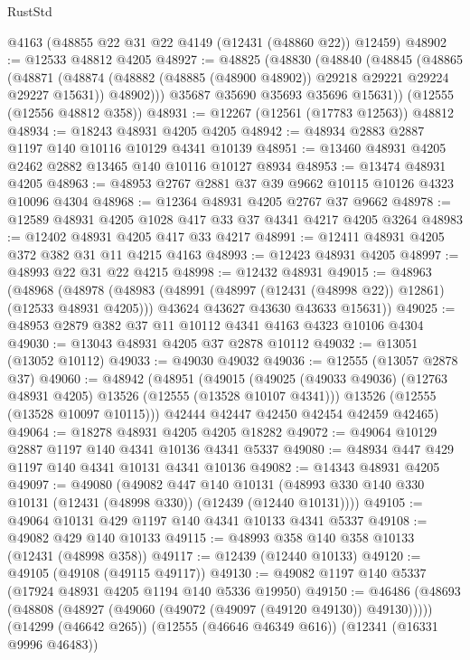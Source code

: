 \begin{lexlean}{RustStd}
\begin{coremodule}
    @4163
    (@48855 @22 @31 @22 @4149 (@12431 (@48860 @22)) @12459)
@48902 := @12533 @48812 @4205
@48927 := @48825
    (@48830
      (@48840
        (@48845
          (@48865
            (@48871
              (@48874 (@48882 (@48885 (@48900 @48902)) @29218 @29221 @29224 @29227 @15631))
              @48902)))
        @35687
        @35690
        @35693
        @35696
        @15631))
    (@12555 (@12556 @48812 @358))
@48931 := @12267 (@12561 (@17783 @12563)) @48812
@48934 := @18243 @48931 @4205 @4205
@48942 := @48934 @2883 @2887 @1197 @140 @10116 @10129 @4341 @10139
@48951 := @13460 @48931 @4205 @2462 @2882 @13465 @140 @10116 @10127 @8934
@48953 := @13474 @48931 @4205
@48963 := @48953 @2767 @2881 @37 @39 @9662 @10115 @10126 @4323 @10096 @4304
@48968 := @12364 @48931 @4205 @2767 @37 @9662
@48978 := @12589 @48931 @4205 @1028 @417 @33 @37 @4341 @4217 @4205 @3264
@48983 := @12402 @48931 @4205 @417 @33 @4217
@48991 := @12411 @48931 @4205 @372 @382 @31 @11 @4215 @4163
@48993 := @12423 @48931 @4205
@48997 := @48993 @22 @31 @22 @4215
@48998 := @12432 @48931
@49015 := @48963
    (@48968
      (@48978
        (@48983 (@48991 (@48997 (@12431 (@48998 @22)) @12861) (@12533 @48931 @4205)))
        @43624
        @43627
        @43630
        @43633
        @15631))
@49025 := @48953 @2879 @382 @37 @11 @10112 @4341 @4163 @4323 @10106 @4304
@49030 := @13043 @48931 @4205 @37 @2878 @10112
@49032 := @13051 (@13052 @10112)
@49033 := @49030 @49032
@49036 := @12555 (@13057 @2878 @37)
@49060 := @48942
    (@48951
      (@49015
        (@49025 (@49033 @49036) (@12763 @48931 @4205) @13526 (@12555 (@13528 @10107 @4341)))
        @13526
        (@12555 (@13528 @10097 @10115)))
      @42444
      @42447
      @42450
      @42454
      @42459
      @42465)
@49064 := @18278 @48931 @4205 @4205 @18282
@49072 := @49064 @10129 @2887 @1197 @140 @4341 @10136 @4341 @5337
@49080 := @48934 @447 @429 @1197 @140 @4341 @10131 @4341 @10136
@49082 := @14343 @48931 @4205
@49097 := @49080
    (@49082
      @447
      @140
      @10131
      (@48993 @330 @140 @330 @10131 (@12431 (@48998 @330)) (@12439 (@12440 @10131))))
@49105 := @49064 @10131 @429 @1197 @140 @4341 @10133 @4341 @5337
@49108 := @49082 @429 @140 @10133
@49115 := @48993 @358 @140 @358 @10133 (@12431 (@48998 @358))
@49117 := @12439 (@12440 @10133)
@49120 := @49105 (@49108 (@49115 @49117))
@49130 := @49082 @1197 @140 @5337 (@17924 @48931 @4205 @1194 @140 @5336 @19950)
@49150 := @46486
    (@48693 (@48808 (@48927 (@49060 (@49072 (@49097 (@49120 @49130)) @49130)))))
    (@14299 (@46642 @265))
    (@12555 (@46646 @46349 @616))
    (@12341 (@16331 @9996 @46483))

\end{coremodule}
\end{lexlean}
